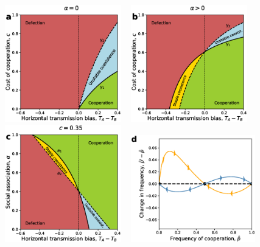 \documentclass[12pt]{extarticle}
\begin{document}
\begin{figure}[p]
  \centering       
    \includegraphics[width=0.45\textwidth]{Result2_c_zero_alpha.eps}
	  ~
    \includegraphics[width=0.45\textwidth]{Result2_c_non_zero_alpha.eps}
    ~
    \includegraphics[width=0.45\textwidth]{Result2_alpha.eps}   
    ~
    \includegraphics[width=0.48\textwidth]{coexistence_without_oblique.eps}

\end{figure}
\end{document}
